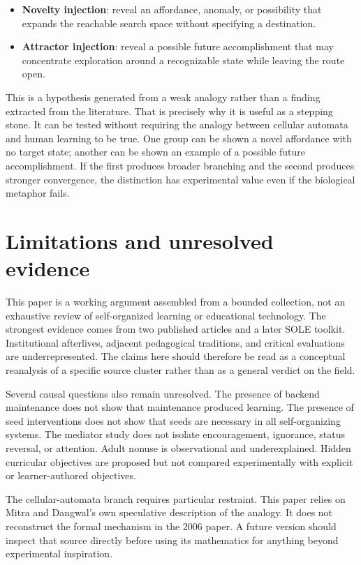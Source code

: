 \documentclass[11pt]{article}
\begin{document}
\begin{itemize}
\item \textbf{Novelty injection}: reveal an affordance, anomaly, or possibility that expands the reachable search space without specifying a destination.
\item \textbf{Attractor injection}: reveal a possible future accomplishment that may concentrate exploration around a recognizable state while leaving the route open.
\end{itemize}

This is a hypothesis generated from a weak analogy rather than a finding extracted from the literature. That is precisely why it is useful as a stepping stone. It can be tested without requiring the analogy between cellular automata and human learning to be true. One group can be shown a novel affordance with no target state; another can be shown an example of a possible future accomplishment. If the first produces broader branching and the second produces stronger convergence, the distinction has experimental value even if the biological metaphor fails.

\section{Limitations and unresolved evidence}
This paper is a working argument assembled from a bounded collection, not an exhaustive review of self-organized learning or educational technology. The strongest evidence comes from two published articles and a later SOLE toolkit. Institutional afterlives, adjacent pedagogical traditions, and critical evaluations are underrepresented. The claims here should therefore be read as a conceptual reanalysis of a specific source cluster rather than as a general verdict on the field.

Several causal questions also remain unresolved. The presence of backend maintenance does not show that maintenance produced learning. The presence of seed interventions does not show that seeds are necessary in all self-organizing systems. The mediator study does not isolate encouragement, ignorance, status reversal, or attention. Adult nonuse is observational and underexplained. Hidden curricular objectives are proposed but not compared experimentally with explicit or learner-authored objectives.

The cellular-automata branch requires particular restraint. This paper relies on Mitra and Dangwal's own speculative description of the analogy. It does not reconstruct the formal mechanism in the 2006 paper. A future version should inspect that source directly before using its mathematics for anything beyond experimental inspiration.
\end{document}
